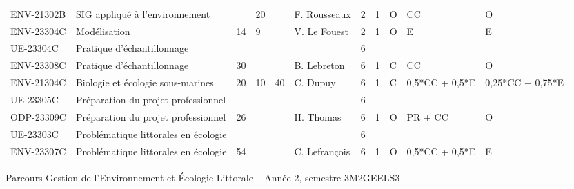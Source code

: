 \documentclass[a4paper,11pt]{article}
\begin{document}
{{\begin{tabular}{lllllllllll}
\cellcolor[HTML]{FD6864}ENV-21302B & \cellcolor[HTML]{FD6864}SIG appliqué à l'environnement                 &    & 20 &                           & F. Rousseaux                       & 2    & 1    & O           & CC                                     & O                         \\
ENV-23304C                         & Modélisation                                                           & 14 & 9  &                           & V. Le Fouest                       & 2    & 1    & O           & \cellcolor[HTML]{FD6864}E              & E                         \\
\rowcolor[HTML]{EFEFEF} 
UE-23304C                          & Pratique d'échantillonnage                                             &    &    &                           &                                    & 6    &      &             &                                        &                           \\
ENV-23308C                         & Pratique d'échantillonnage                                             & 30 &    &                           & B. Lebreton                        & 6    & 1    & C           & CC                                     & O                         \\
ENV-21304C                         & Biologie et écologie sous-marines                                      & 20 & 10 & 40                        & C. Dupuy                           & 6    & 1    & C           & 0,5*CC + 0,5*E                         & 0,25*CC + 0,75*E          \\
\rowcolor[HTML]{EFEFEF} 
UE-23305C                          & Préparation du projet professionnel                                    &    &    &                           &                                    & 6    &      &             &                                        &                           \\
ODP-23309C                         & Préparation du projet professionnel                                    & 26 &    &                           & H. Thomas                          & 6    & 1    & O           & PR + CC                                & O                         \\
\rowcolor[HTML]{EFEFEF} 
UE-23303C                          & Problématique littorales en écologie                                   &    &    &                           &                                    & 6    &      &             &                                        &                           \\
ENV-23307C                         & Problématique littorales en écologie                                   & 54 &    &                           & C. Lefrançois                      & 6    & 1    & O           & 0,5*CC + 0,5*E                         & \cellcolor[HTML]{FD6864}E
\end{tabular}}
}{Parcours Gestion de l'Environnement et Écologie Littorale -- Année 2, semestre 3}{M2GEELS3}
\end{document}
